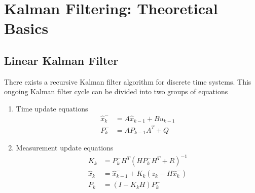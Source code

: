 \chapter{Kalman Filtering: Theoretical Basics}

\section{Linear Kalman Filter}
There exists a recursive Kalman filter algorithm for discrete time systems.\cite{IntroKF} This ongoing Kalman filter cycle can be divided into two groups of equations
\newline
\begin{enumerate}
	\item Time update equations
	\begin{equation}\label{TupEq}
		\begin{aligned}
    			\hat{x}_{k}^{-} &= A\hat{x}_{k-1}+Bu_{k-1} \\
    			P_{k}^{-} &= AP_{k-1}A^{T}+Q
  		\end{aligned}
	\end{equation}
	\item Measurement update equations
	\begin{equation}\label{MupEq}
		\begin{aligned}
    			K_{k} &= P_{k}^{-}H^{T}(HP_{k}^{-}H^{T}+R)^{-1} \\
    			\hat{x}_{k} &= \hat{x}_{k-1}^{-}+K_{k}(z_{k}-H\hat{x}_{k}^{-}) \\
			P_{k} &= (I-K_{k}H)P_{k}^{-}
  		\end{aligned}
	\end{equation}
\end{enumerate}

